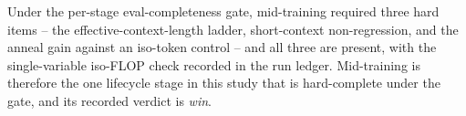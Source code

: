 Under the per-stage eval-completeness gate, mid-training required three hard items -- the effective-context-length ladder, short-context non-regression, and the anneal gain against an iso-token control -- and all three are present, with the single-variable iso-FLOP check recorded in the run ledger. Mid-training is therefore the one lifecycle stage in this study that is hard-complete under the gate, and its recorded verdict is \emph{win}.
